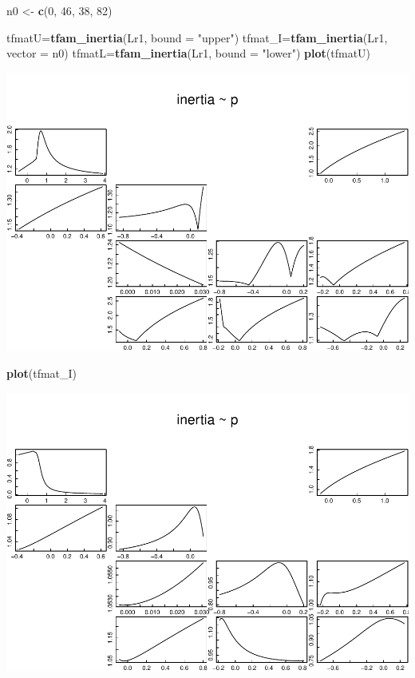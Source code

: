 \documentclass[
]{book}
\newenvironment{Shaded}{\begin{snugshade}}{\end{snugshade}}
\newcommand{\AttributeTok}[1]{\textcolor[rgb]{0.13,0.29,0.53}{#1}}
\newcommand{\DecValTok}[1]{\textcolor[rgb]{0.00,0.00,0.81}{#1}}
\newcommand{\FunctionTok}[1]{\textcolor[rgb]{0.13,0.29,0.53}{\textbf{#1}}}
\newcommand{\NormalTok}[1]{#1}
\newcommand{\OtherTok}[1]{\textcolor[rgb]{0.56,0.35,0.01}{#1}}
\newcommand{\StringTok}[1]{\textcolor[rgb]{0.31,0.60,0.02}{#1}}
\theoremstyle{definition}
\theoremstyle{definition}
\theoremstyle{definition}
\theoremstyle{definition}
\theoremstyle{remark}
\begin{document}
\begin{Shaded}
\begin{Highlighting}[]
\NormalTok{n0 }\OtherTok{\textless{}{-}} \FunctionTok{c}\NormalTok{(}\DecValTok{0}\NormalTok{, }\DecValTok{46}\NormalTok{, }\DecValTok{38}\NormalTok{, }\DecValTok{82}\NormalTok{)}

\NormalTok{tfmatU}\OtherTok{=}\FunctionTok{tfam\_inertia}\NormalTok{(Lr1, }\AttributeTok{bound =} \StringTok{"upper"}\NormalTok{)}
\NormalTok{tfmat\_I}\OtherTok{=}\FunctionTok{tfam\_inertia}\NormalTok{(Lr1, }\AttributeTok{vector =}\NormalTok{ n0)}
\NormalTok{tfmatL}\OtherTok{=}\FunctionTok{tfam\_inertia}\NormalTok{(Lr1, }\AttributeTok{bound =} \StringTok{"lower"}\NormalTok{)}
\FunctionTok{plot}\NormalTok{(tfmatU)}
\end{Highlighting}
\end{Shaded}

\includegraphics{Diagnostico_Poblacional_files/figure-latex/unnamed-chunk-22-1.pdf}

\begin{Shaded}
\begin{Highlighting}[]
\FunctionTok{plot}\NormalTok{(tfmat\_I)}
\end{Highlighting}
\end{Shaded}

\includegraphics{Diagnostico_Poblacional_files/figure-latex/unnamed-chunk-22-2.pdf}
\end{document}
